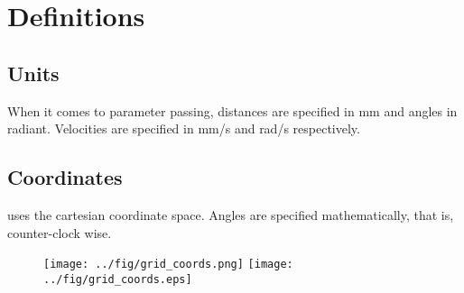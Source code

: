 \chapter{Definitions}


\section{Units}

When it comes to parameter passing, distances are specified in mm and
angles in radiant. Velocities are specified in mm/s and rad/s
respectively. 

\section{Coordinates}

\miro uses the cartesian coordinate space. Angles are specified
mathematically, that is, counter-clock wise.



\begin{figure}[!ht]
  \begin{center}
    \ifpdf
    \texttt{[image: ../fig/grid\_coords.png]}
    \else
    \texttt{[image: ../fig/grid\_coords.eps]}
    \fi
  \end{center}
\end{figure}


